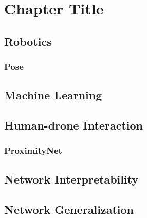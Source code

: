 \chapter{Chapter Title}
\label{chap:}

\lipsum[1]



\section{Robotics}
\label{sec:robotics}

\subsection{Pose}
\label{subsec:robot-pose}



\section{Machine Learning}
\label{sec:machine-learning}




\section{Human-drone Interaction}
\label{sec:human-drone-interaction}


\subsection{ProximityNet}
\label{subsec:proximitynet}




\section{Network Interpretability}
\label{sec:network-interpretability}




\section{Network Generalization}
\label{sec:network-generalization}





